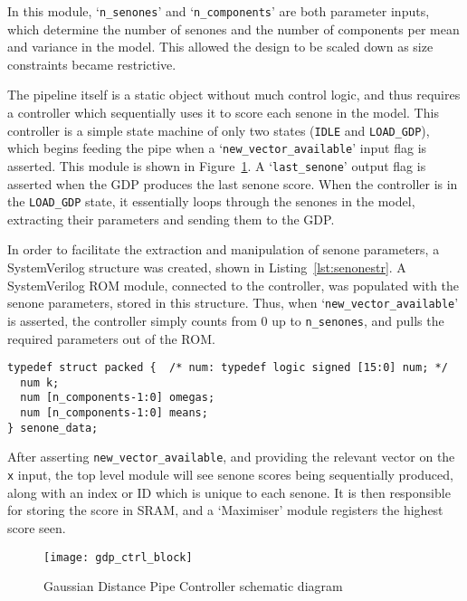 		In this module, `\texttt{n\_senones}' and `\texttt{n\_components}' are both parameter inputs, which determine the number of senones and the number of components per mean and variance in the model.  This allowed the design to be scaled down as size constraints became restrictive.

		The pipeline itself is a static object without much control logic, and thus requires a controller which sequentially uses it to score each senone in the model.  This controller is a simple state machine of only two states (\texttt{IDLE} and \texttt{LOAD\_GDP}), which begins feeding the pipe when a `\texttt{new\_vector\_available}' input flag is asserted.  This module is shown in Figure~\ref{fig:gdp_ctrl_block}.  A `\texttt{last\_senone}' output flag is asserted when the GDP produces the last senone score.  When the controller is in the \texttt{LOAD\_GDP} state, it essentially loops through the senones in the model, extracting their parameters and sending them to the GDP.  

		In order to facilitate the extraction and manipulation of senone parameters, a SystemVerilog structure was created, shown in Listing~\ref{lst:senonestr}. A SystemVerilog ROM module, connected to the controller, was populated with the senone parameters, stored in this structure.  Thus, when `\texttt{new\_vector\_available}' is asserted, the controller simply counts from 0 up to \texttt{n\_senones}, and pulls the required parameters out of the ROM.

\begin{lstlisting}[style=customc, label=lst:senonestr, caption=Senone parameter data structure]
typedef struct packed {  /* num: typedef logic signed [15:0] num; */
  num k;
  num [n_components-1:0] omegas;
  num [n_components-1:0] means;
} senone_data;
\end{lstlisting}

		After asserting \texttt{new\_vector\_available}, and providing the relevant vector on the \texttt{x} input, the top level module will see  senone scores being sequentially produced, along with an index or ID which is unique to each senone.  It is then responsible for storing the score in SRAM, and a `Maximiser' module registers the highest score seen.
		\begin{figure}[tb]
			\begin{center}
				\texttt{[image: gdp\_ctrl\_block]}
			\end{center}
			\caption{Gaussian Distance Pipe Controller schematic diagram}
			\label{fig:gdp_ctrl_block}
		\end{figure}

